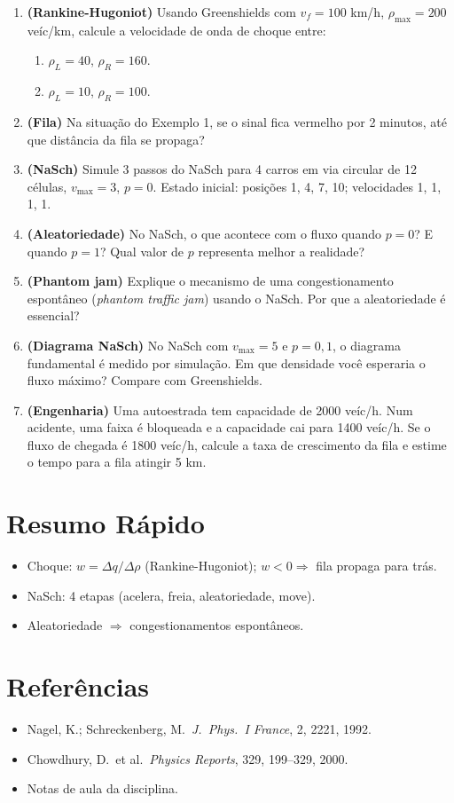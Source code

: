 \documentclass[12pt,a4paper]{article}
\begin{document}
\begin{enumerate}
  \item \textbf{(Rankine-Hugoniot)} Usando Greenshields com $v_f=100$ km/h, $\rho_\text{max}=200$ ve\'ic/km, calcule a velocidade de onda de choque entre:
    \begin{enumerate}
      \item[$a.$] $\rho_L=40$, $\rho_R=160$.
      \item[$b.$] $\rho_L=10$, $\rho_R=100$.
    \end{enumerate}
  
  \item \textbf{(Fila)} Na situa\c{c}\~ao do Exemplo 1, se o sinal fica vermelho por 2 minutos, at\'e que dist\^ancia da fila se propaga?
  
  \item \textbf{(NaSch)} Simule 3 passos do NaSch para 4 carros em via circular de 12 c\'elulas, $v_\text{max}=3$, $p=0$. Estado inicial: posi\c{c}\~oes 1, 4, 7, 10; velocidades 1, 1, 1, 1.
  
  \item \textbf{(Aleatoriedade)} No NaSch, o que acontece com o fluxo quando $p=0$? E quando $p=1$? Qual valor de $p$ representa melhor a realidade?
  
  \item \textbf{(Phantom jam)} Explique o mecanismo de uma congestionamento espont\^aneo (\textit{phantom traffic jam}) usando o NaSch. Por que a aleatoriedade \'e essencial?
  
  \item \textbf{(Diagrama NaSch)} No NaSch com $v_\text{max}=5$ e $p=0{,}1$, o diagrama fundamental \'e medido por simula\c{c}\~ao. Em que densidade voc\^e esperaria o fluxo m\'aximo? Compare com Greenshields.
  
  \item \textbf{(Engenharia)} Uma autoestrada tem capacidade de 2000 ve\'ic/h. Num acidente, uma faixa \'e bloqueada e a capacidade cai para 1400 ve\'ic/h. Se o fluxo de chegada \'e 1800 ve\'ic/h, calcule a taxa de crescimento da fila e estime o tempo para a fila atingir 5 km.
\end{enumerate}

\section*{Resumo R\'apido}
\begin{itemize}
  \item Choque: $w = \Delta q / \Delta\rho$ (Rankine-Hugoniot); $w<0 \Rightarrow$ fila propaga para tr\'as.
  \item NaSch: 4 etapas (acelera, freia, aleatoriedade, move).
  \item Aleatoriedade $\Rightarrow$ congestionamentos espont\^aneos.
\end{itemize}

\section*{Refer\^encias}
\begin{itemize}
  \item Nagel, K.; Schreckenberg, M.\ \textit{J.\ Phys.\ I France}, 2, 2221, 1992.
  \item Chowdhury, D.\ et al.\ \textit{Physics Reports}, 329, 199--329, 2000.
  \item Notas de aula da disciplina.
\end{itemize}
\end{document}
